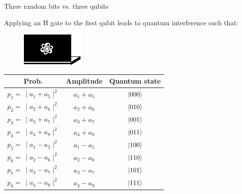 \documentclass[10pt]{beamer}
\begin{document}
{
\begin{frame}[fragile]{Three random bits vs. three qubits}

Applying an H gate to the first qubit leads to quantum interference such that:
\centering
\begin{figure}
\includegraphics[scale=1.2]{Vectors/laptop_q.eps}\\
\end{figure}
\vspace{0.5cm}
\begin{table}
\begin{tabular}{c | c | c}
	Prob. & Amplitude & Quantum state \\
	\midrule
	$p_1 = \,\mid a_1+a_5 \mid^2$ & $a_1+a_5$ & $\ket{000}$ \\
	$p_2 =\, \mid a_2+a_6 \mid^2$ & $a_2+a_6$ & $\ket{010}$ \\
	$p_3 = \,\mid a_3+a_7 \mid^2$ & $a_3+a_7$ & $\ket{001}$ \\
	$p_4 = \,\mid a_4+a_8 \mid^2$ & $a_4+a_8$ & $\ket{011}$ \\
	$p_5 = \,\mid a_1-a_5 \mid^2$ & $a_1-a_5$ & $\ket{100}$ \\
	$p_6 = \,\mid a_2-a_6 \mid^2$ & $a_2-a_6$ & $\ket{110}$ \\
	$p_7 = \,\mid a_3-a_7 \mid^2$ & $a_3-a_7$ & $\ket{101}$ \\
	$p_8 = \,\mid a_4-a_8 \mid^2$ & $a_4-a_8$ & $\ket{111}$ \\
	
\end{tabular}
\end{table}

\end{frame}
}
\end{document}
